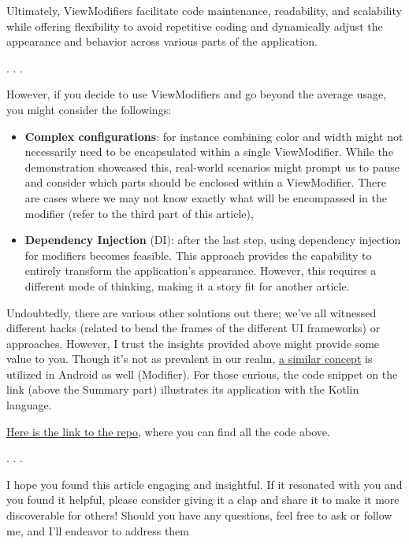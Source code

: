 \documentclass{article}
\newcommand{\separator}{\vspace{5mm}\centerline{. . .}\vspace{5mm}}
\begin{document}
Ultimately, ViewModifiers facilitate code maintenance, readability, and scalability while offering flexibility to avoid repetitive coding and dynamically adjust the appearance and behavior across various parts of the application.

\separator

However, if you decide to use ViewModifiers and go beyond the average usage, you might consider the followings:

\begin{itemize}
  \item \textbf{Complex configurations}: for instance combining color and width might not necessarily need to be encapsulated within a single ViewModifier. While the demonstration showcased this, real-world scenarios might prompt us to pause and consider which parts should be enclosed within a ViewModifier. There are cases where we may not know exactly what will be encompassed in the modifier (refer to the third part of this article),
  \item \textbf{Dependency Injection} (DI): after the last step, using dependency injection for modifiers becomes feasible. This approach provides the capability to entirely transform the application’s appearance. However, this requires a different mode of thinking, making it a story fit for another article.
\end{itemize}

Undoubtedly, there are various other solutions out there; we’ve all witnessed different hacks (related to bend the frames of the different UI frameworks) or approaches. However, I trust the insights provided above might provide some value to you. Though it’s not as prevalent in our realm, \href{https://developer.android.com/reference/kotlin/androidx/compose/ui/Modifier#summary}{a similar concept} is utilized in Android as well (Modifier). For those curious, the code snippet on the link (above the Summary part) illustrates its application with the Kotlin language.

\href{https://github.com/stateman92/Medium-ViewModifier}{Here is the link to the repo}, where you can find all the code above.

\separator

I hope you found this article engaging and insightful. If it resonated with you and you found it helpful, please consider giving it a clap and share it to make it more discoverable for others! Should you have any questions, feel free to ask or follow me, and I’ll endeavor to address them 
\end{document}

